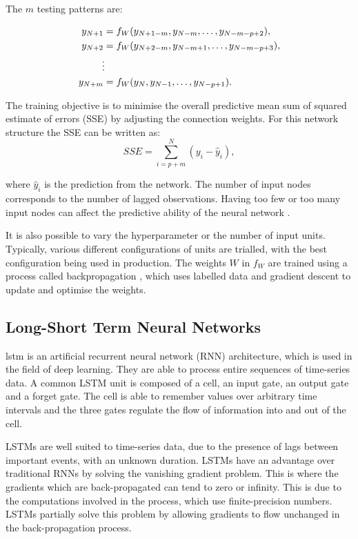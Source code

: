 The $m$ testing patterns are:

\begin{align}
y_{N+1} & =f_{W}(y_{N+1-m}, y_{N-m},\ldots,y_{N-m-p+2}),\\
y_{N+2} & =f_{W}(y_{N+2-m}, y_{N-m+1},\ldots,y_{N-m-p+3}),\\
&\vdotswithin  \notag \\
y_{N+m} & =f_{W}(y_{N},y_{N-1},\ldots,y_{N-p+1}).
\end{align}

The training objective is to minimise the overall predictive mean sum of squared estimate of errors (SSE) by adjusting the connection weights. For this network structure the SSE can be written as:
\begin{equation}
SSE = \sum_{i=p+m}^N(y_i-\hat{y}_i),
\end{equation}

\noindent where $\hat{y}_i$ is the prediction from the network. The number of input nodes corresponds to the number of lagged observations. Having too few or too many input nodes can affect the predictive ability of the neural network \cite{Pao2007}.

It is also possible to vary the hyperparameter or the number of input units. Typically, various different configurations of units are trialled, with the best configuration being used in production. The weights $W$ in $f_W$ are trained using a process called backpropagation \cite{rumelhart1986learning}, which uses labelled data and gradient descent to update and optimise the weights.

\subsection{Long-Short Term Neural Networks}

\acrfull{lstm} \cite{Hochreiter1997} is an artificial recurrent neural network (RNN) architecture, which is used in the field of deep learning. They are able to process entire sequences of time-series data. A common LSTM unit is composed of a cell, an input gate, an output gate and a forget gate. The cell is able to remember values over arbitrary time intervals and the three gates regulate the flow of information into and out of the cell. 

LSTMs are well suited to time-series data, due to the presence of lags between important events, with an unknown duration. LSTMs have an advantage over traditional RNNs by solving the vanishing gradient problem. This is where the gradients which are back-propagated can tend to zero or infinity. This is due to the computations involved in the process, which use finite-precision numbers. LSTMs partially solve this problem by allowing gradients to flow unchanged in the back-propagation process.






